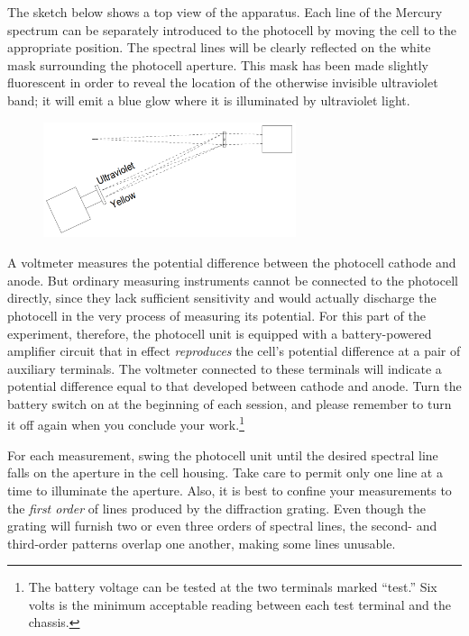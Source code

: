 The sketch below shows a top view of the apparatus. Each line of the
Mercury spectrum can be separately introduced to the photocell by moving
the cell to the appropriate position. The spectral lines will be clearly
reflected on the white mask surrounding the photocell aperture. This
mask has been made slightly fluorescent in order to reveal the location
of the otherwise invisible ultraviolet band; it will emit a blue glow
where it is illuminated by ultraviolet light.
\begin{figure}[h]
\centering
  \includegraphics[width=2.91667in,height=1.33333in]{images/06_einstein/005.png}
\end{figure}


A voltmeter measures the potential difference between the photocell
cathode and anode. But ordinary measuring instruments cannot be
connected to the photocell directly, since they lack sufficient
sensitivity and would actually discharge the photocell in the very
process of measuring its potential. For this part of the experiment,
therefore, the photocell unit is equipped with a battery-powered
amplifier circuit that in effect \emph{reproduces} the cell's potential
difference at a pair of auxiliary terminals. The voltmeter connected to
these terminals will indicate a potential difference equal to that
developed between cathode and anode. Turn the battery switch on at the
beginning of each session, and please remember to turn it off again when
you conclude your work.\footnote{The battery voltage can be tested at
  the two terminals marked ``test.'' Six volts is the minimum acceptable
  reading between each test terminal and the chassis.}

For each measurement, swing the photocell unit until the desired
spectral line falls on the aperture in the cell housing. Take care to
permit only one line at a time to illuminate the aperture. Also, it is
best to confine your measurements to the \emph{first order} of lines
produced by the diffraction grating. Even though the grating will
furnish two or even three orders of spectral lines, the second- and
third-order patterns overlap one another, making some lines unusable.

